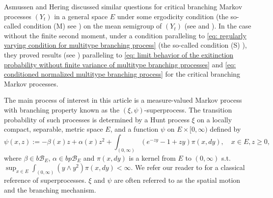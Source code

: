 \documentclass[12pt, a4paper]{amsart}
\theoremstyle{definition}
\numberwithin{equation}{section}
\begin{document}
	Asmussen and Hering \cite{AsmussenHering1983Branching} discussed similar questions for critical branching Markov processes $(Y_t)$ in a general space $E$ under some ergodicity condition (the so-called condition (M) see \cite[p.~156]{AsmussenHering1983Branching}) on the mean semigroup of $(Y_t)$ (see \cite[Section 6.3]{AsmussenHering1983Branching} and \cite[Section 6.4]{AsmussenHering1983Branching}).
	In the case without the finite second moment, under a condition  paralleling  to \eqref{eq: regularly varying condition for multitype branching process} (the so-called condition (S) \cite[p.~207]{AsmussenHering1983Branching}), they proved results (see \cite[Theorem 4.2]{AsmussenHering1983Branching}) paralleling to \eqref{eq: limit behavior of the exitinction probability without finite variance of multitype branching processes} and \eqref{eq: conditioned normalized multitype branching process} for the critical branching Markov processes.
	
	The main process of interest in this article is a measure-valued Markov process with branching property known as the $(\xi, \psi)$-superprocess.
	The transition probability of such processes is determined by a Hunt process $\xi$ on a locally compact, separable, metric space $E$, and a function $\psi$ on $E \times [0,\infty)$ defined by
\[ \label{eq: branching mechanism}
	\psi(x,z):= 
	- \beta(x) z + \alpha (x) z^2 + \int_{(0,\infty)} (e^{-zy} - 1 + zy) \pi(x,dy), 
	\quad x\in E, z\geq 0,
\]
	where $\beta \in b\mathscr B_E$, $\alpha \in bp\mathscr B_E$ and $\pi(x,dy)$ is a kernel from $E$ to $(0,\infty)$ s.t. $\sup_{x\in E} \int_{(0,\infty)} (y\wedge y^2) \pi(x,dy) < \infty$.
	We refer our reader to \cite{Li2011Measure-valued} for a classical reference of superprocesses.
	$\xi$ and $\psi$ are often referred to as the spatial motion and the branching mechanism.
\end{document}
